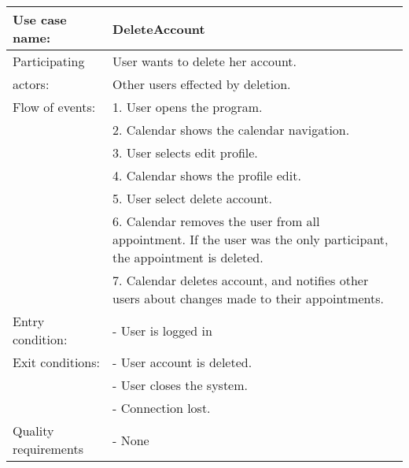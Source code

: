{\tabulinesep=1.2mm
\begin{tabu}{ | p{3cm} | p{13cm} |}
    \hline
    Use case name: 			& 		DeleteAccount\\ \hline
    Participating  			& 		User wants to delete her account. \\
    actors:					&		Other users effected by deletion.\\ \hline
    Flow of events: 		& 		1. User opens the program. \\
							&		2. Calendar shows the calendar navigation.\\
							&		3. User selects edit profile.\\
							&		4. Calendar shows the profile edit.\\
							&		5. User select delete account.\\
							&		6. Calendar removes the user from all appointment. If the user was the only participant, the appointment is deleted.\\
							&		7. Calendar deletes account, and notifies other users about changes made to their appointments. \\\hline
    Entry condition: 		& 		- User is logged in  \\ \hline
	Exit conditions: 		&		- User account is deleted.\\
							&		- User closes the system.\\
							&		- Connection lost.\\\hline
	Quality requirements	&	 	- None \\\hline
\end{tabu}
}